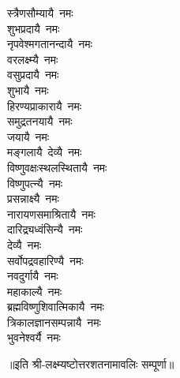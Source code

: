 \begin{multicols}{2}
\begin{flushleft}
स्त्रैणसौम्यायै~नमः\\
शुभप्रदायै~नमः\\
नृपवेश्मगतानन्दायै~नमः\\
वरलक्ष्म्यै~नमः\hfill{}\\
वसुप्रदायै~नमः\\
शुभायै~नमः\\
हिरण्यप्राकारायै~नमः\\
समुद्रतनयायै~नमः\\
जयायै~नमः\\
मङ्गलायै~देव्यै~नमः\\
विष्णुवक्षःस्थलस्थितायै~नमः\\
विष्णुपत्न्यै~नमः\\
प्रसन्नाक्ष्यै~नमः\\
नारायणसमाश्रितायै~नमः\hfill{}\\
दारिद्र्यध्वंसिन्यै~नमः\\
देव्यै~नमः\\
सर्वोपद्रवहारिण्यै~नमः\\
नवदुर्गायै~नमः\\
महाकाल्यै~नमः\\
ब्रह्मविष्णुशिवात्मिकायै~नमः\\
त्रिकालज्ञानसम्पन्नायै~नमः\\
भुवनेश्वर्यै~नमः\\
\end{flushleft}
\end{multicols}
॥इति श्री-लक्ष्म्यष्टोत्तरशतनामावलिः सम्पूर्णा॥